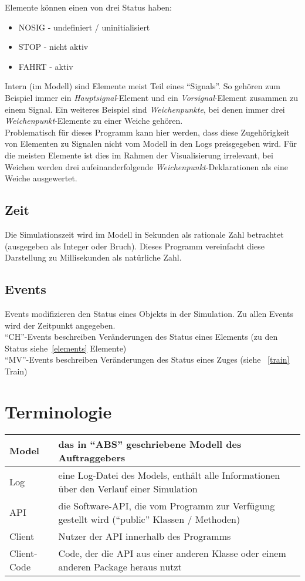 \documentclass[accentcolor=tud0b,12pt,paper=a4]{tudreport}
\begin{document}
			Elemente können einen von drei Status haben:
			\begin{itemize}
				\item NOSIG - undefiniert / uninitialisiert
				\item STOP  - nicht aktiv
				\item FAHRT - aktiv
			\end{itemize}
		
			Intern (im Modell) sind Elemente meist Teil eines "`Signals"'. So gehören zum Beispiel immer ein \textit{Hauptsignal}-Element und ein \textit{Vorsignal}-Element zusammen zu einem Signal. Ein weiteres Beispiel sind \textit{Weichenpunkte}, bei denen immer drei \textit{Weichenpunkt}-Elemente zu einer Weiche gehören.\\
			Problematisch für dieses Programm kann hier werden, dass diese Zugehörigkeit von Elementen zu Signalen nicht vom Modell in den Logs preisgegeben wird. Für die meisten Elemente ist dies im Rahmen der Visualisierung irrelevant, bei Weichen werden drei aufeinanderfolgende \textit{Weichenpunkt}-Deklarationen als eine Weiche ausgewertet.

		\subsection{Zeit}
			Die Simulationszeit wird im Modell in Sekunden als rationale Zahl betrachtet (ausgegeben als Integer oder Bruch). Dieses Programm vereinfacht diese Darstellung zu Millisekunden als natürliche Zahl.

		\subsection{Events}
		\label{events}
			Events modifizieren den Status eines Objekts in der Simulation. Zu allen Events wird der Zeitpunkt angegeben.\\
			
			"`CH"'-Events beschreiben Veränderungen des Status eines Elements (zu den Status siehe~\ref{elements} Elemente)\\
			"`MV"'-Events beschreiben Veränderungen des Status eines Zuges (siehe ~\ref{train} Train)

	\section{Terminologie}
		\begin{tabular}{| p{3cm} | p{13cm} |}
			\hline
			Model & das in "`ABS"' geschriebene Modell des Auftraggebers \\ \hline
			Log & eine Log-Datei des Models, enthält alle Informationen über den Verlauf einer Simulation \\ \hline
			API & die Software-API, die vom Programm zur Verfügung gestellt wird ("`public"' Klassen / Methoden) \\ \hline
			Client & Nutzer der API innerhalb des Programms \\ \hline
			Client-Code & Code, der die API aus einer anderen Klasse oder einem anderen Package heraus nutzt \\
			\hline
		\end{tabular}
		
\end{document}
